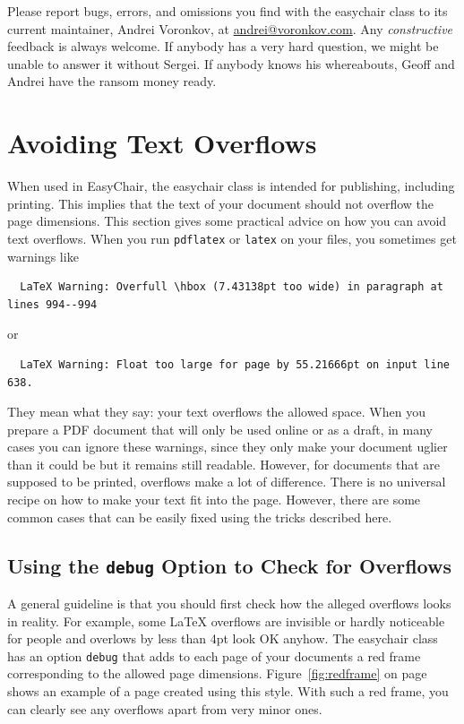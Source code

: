 \documentclass{easychair}
\newcommand{\easychair}{\textsf{easychair}}
\begin{document}
Please report bugs, errors, and omissions you find with the {\easychair} 
class to its current maintainer, Andrei Voronkov,
at \url{andrei@voronkov.com}. Any \emph{constructive} feedback is
always welcome. If anybody has a very hard question, we might be
unable to answer it without Sergei. If anybody knows his whereabouts,
Geoff and Andrei have the ransom money ready.


\section{Avoiding Text Overflows}

When used in EasyChair, the {\easychair} class is intended for
publishing, including printing. This implies that the text of your
document should not overflow the page dimensions. This section gives
some practical advice on how you can avoid text overflows. When you
run \texttt{pdflatex} or \texttt{latex} on your files, you sometimes
get warnings like

\small
\begin{verbatim}
  LaTeX Warning: Overfull \hbox (7.43138pt too wide) in paragraph at lines 994--994
\end{verbatim}
\normalsize
or

\small
\begin{verbatim}
  LaTeX Warning: Float too large for page by 55.21666pt on input line 638.
\end{verbatim}
\normalsize
They mean what they say: your text overflows the allowed space. When
you prepare a PDF document that will only be used online or as a
draft, in many cases you can ignore these warnings, since they only
make your document uglier than it could be but it remains still
readable. However, for documents that are supposed to be printed,
overflows make a lot of difference. There is no universal recipe on
how to make your text fit into the page. However, there are some
common cases that can be easily fixed using the tricks described
here. 

\subsection{Using the \texttt{debug} Option to Check for Overflows}

A general guideline is that you should first check how the alleged
overflows looks in reality. For example, some LaTeX overflows are
invisible or hardly noticeable for people and overlows by
less than 4pt look OK anyhow. The {\easychair} class has an option
\texttt{debug} that adds to each page of your documents a red frame
corresponding to the allowed page
dimensions. Figure~\ref{fig:redframe} on page~\pageref{fig:redframe}
shows an example of a page created using this style. With such a red
frame, you can clearly see any overflows apart from very minor ones.
\end{document}

